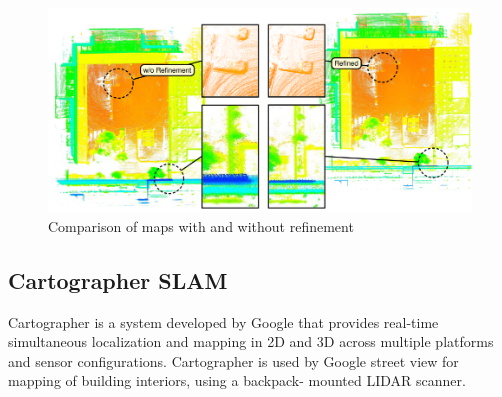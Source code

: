 \begin{figure}[!ht]
    \centering
    \includegraphics[width=150mm, keepaspectratio]{figures/3d_slam_example.png}
    \caption{Comparison of maps with and without refinement\cite{droeschel2018efficient}} 
    \label{fig:3d_lidar_mapping_example}
\end{figure}


\subsection{Cartographer SLAM}
Cartographer is a system developed by Google that provides real-time simultaneous localization and mapping
in 2D and 3D across multiple platforms and sensor configurations. Cartographer is used by Google street view
for mapping of building interiors, using a backpack- mounted LIDAR scanner.

